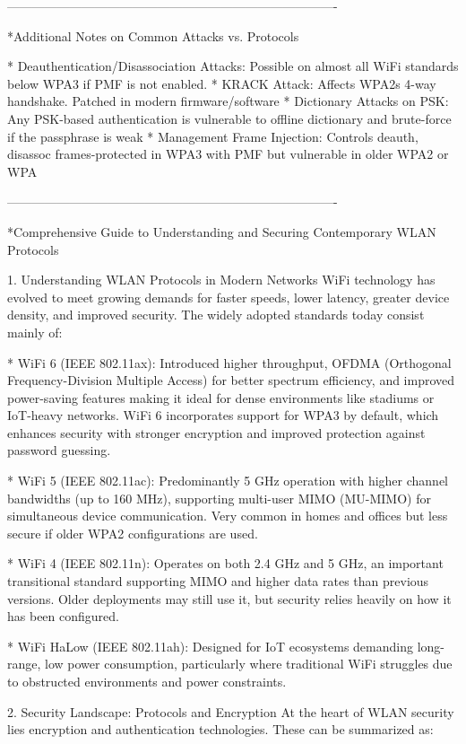 -------------------------------------------------------------------------------

*Additional Notes on Common Attacks vs. Protocols

* Deauthentication/Disassociation Attacks:
	Possible on almost all WiFi standards below WPA3 if PMF is not enabled.
* KRACK Attack:
	Affects WPA2s 4-way handshake. Patched in modern firmware/software	
* Dictionary Attacks on PSK:
	Any PSK-based authentication is vulnerable to offline dictionary and brute-force if the passphrase is weak
* Management Frame Injection:
	Controls deauth, disassoc frames-protected in WPA3 with PMF but vulnerable in older WPA2 or WPA

-------------------------------------------------------------------------------

*Comprehensive Guide to Understanding and Securing Contemporary WLAN Protocols

1. Understanding WLAN Protocols in Modern Networks
WiFi technology has evolved to meet growing demands for faster speeds, lower latency, greater device density, and improved security. The widely adopted standards today consist mainly of:

* WiFi 6 (IEEE 802.11ax):
Introduced higher throughput, OFDMA (Orthogonal Frequency-Division Multiple Access) for better spectrum efficiency, and improved power-saving features making it ideal for dense environments like stadiums or IoT-heavy networks. WiFi 6 incorporates support for WPA3 by default, which enhances security with stronger encryption and improved protection against password guessing.

* WiFi 5 (IEEE 802.11ac):
Predominantly 5 GHz operation with higher channel bandwidths (up to 160 MHz), supporting multi-user MIMO (MU-MIMO) for simultaneous device communication. Very common in homes and offices but less secure if older WPA2 configurations are used.

* WiFi 4 (IEEE 802.11n):
Operates on both 2.4 GHz and 5 GHz, an important transitional standard supporting MIMO and higher data rates than previous versions. Older deployments may still use it, but security relies heavily on how it has been configured.

* WiFi HaLow (IEEE 802.11ah):
Designed for IoT ecosystems demanding long-range, low power consumption, particularly where traditional WiFi struggles due to obstructed environments and power constraints.

2. Security Landscape: Protocols and Encryption
At the heart of WLAN security lies encryption and authentication technologies. These can be summarized as:

